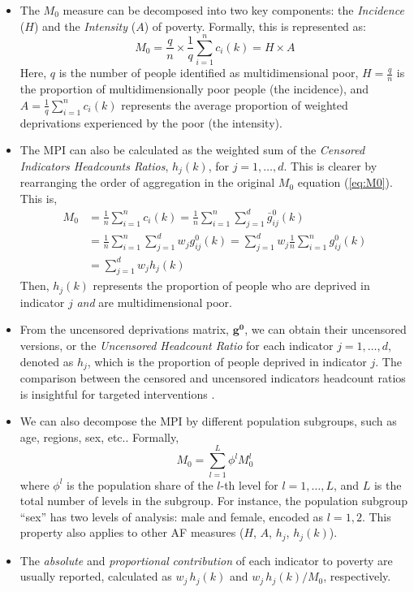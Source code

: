 \begin{itemize}
\item
  The \(M_0\) measure can be decomposed into two key components: the \emph{Incidence} (\(H\)) and the \emph{Intensity} (\(A\)) of poverty. Formally, this is represented as: \[M_0 = \frac{q}{n} \times \frac{1}{q}\sum_{i=1}^n c_i(k) = H \times A \] Here, \(q\) is the number of people identified as multidimensional poor, \(H=\frac{q}{n}\) is the proportion of multidimensionally poor people (the incidence), and \(A= \frac{1}{q}\sum_{i=1}^n c_i(k)\) represents the average proportion of weighted deprivations experienced by the poor (the intensity).
\item
  The MPI can also be calculated as the weighted sum of the \emph{Censored Indicators Headcounts Ratios}, \(h_j(k)\), for \(j=1,\ldots,d\). This is clearer by rearranging the order of aggregation in the original \(M_0\) equation (\ref{eq:M0}). This is, \begin{align}
  M_0 &= \frac{1}{n} \sum_{i=1}^n c_i(k) = \frac{1}{n} \sum_{i=1}^n \sum_{j=1}^d \bar{g}^0_{ij}(k) \\ &= \frac{1}{n} \sum_{i=1}^n \sum_{j=1}^d w_j g^0_{ij}(k)  = \sum_{j=1}^d w_j \frac{1}{n} \sum_{i=1}^n g^0_{ij}(k)  \\ &= \sum_{j=1}^d w_j h_j(k)
  \end{align}
  Then, \(h_j(k)\) represents the proportion of people who are deprived in indicator \(j\) \emph{and} are multidimensional poor.
\item
  From the uncensored deprivations matrix, \(\mathbf{g^0}\), we can obtain their uncensored versions, or the \emph{Uncensored Headcount Ratio} for each indicator \(j=1,\dots,d\), denoted as \(h_j\), which is the proportion of people deprived in indicator \(j\). The comparison between the censored and uncensored indicators headcount ratios is insightful for targeted interventions \citep{MPIpolicytool}.
\item
  We can also decompose the MPI by different population subgroups, such as age, regions, sex, etc.. Formally,
  \[ M_0 = \sum_{l=1}^L \phi^l M_0^l\] where \(\phi^l\) is the population share of the \(l\)-th level for \(l =1, \ldots, L\), and \(L\) is the total number of levels in the subgroup. For instance, the population subgroup ``sex'' has two levels of analysis: male and female, encoded as \(l=1,2\). This property also applies to other AF measures (\(H\), \(A\), \(h_j\), \(h_j(k)\)).
\item
  The \emph{absolute} and \emph{proportional} \emph{contribution} of each indicator to poverty are usually reported, calculated as \(w_j \, h_j(k)\) and \(w_j \, h_j(k)/M_0\), respectively.
\end{itemize}

